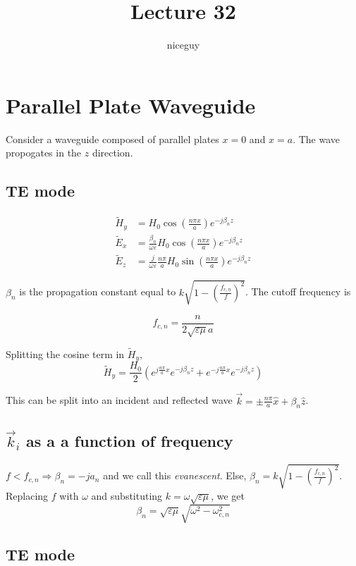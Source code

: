 \documentclass[12pt]{article}
\title{Lecture 32}
\author{niceguy}
\begin{document}
\maketitle

\section{Parallel Plate Waveguide}

Consider a waveguide composed of parallel plates $x = 0$ and $x = a$. The wave propogates in the $z$ direction.

\subsection{TE mode}

\begin{align*}
    \tilde H_y &= H_0\cos\left(\frac{n\pi x}{a}\right)e^{-j\beta_nz} \\
    \tilde E_x &= \frac{\beta_n}{\omega\varepsilon} H_0\cos\left(\frac{n\pi x}{a}\right) e^{-j\beta_nz} \\
    \tilde E_z &= \frac{j}{\omega\varepsilon} \frac{n\pi}{a} H_0\sin\left(\frac{n\pi x}{a}\right)e^{-j\beta_nz}
\end{align*}

$\beta_n$ is the propagation constant equal to $k\sqrt{1 - \left(\frac{f_{c,n}}{f}\right)^2}$. The cutoff frequency is

$$f_{c,n} = \frac{n}{2\sqrt{\varepsilon\mu}a}$$

Splitting the cosine term in $\tilde H_y$,
$$\tilde H_y = \frac{H_0}{2}\left(e^{j\frac{n\pi}{a}x}e^{-j\beta_nz} + e^{-j\frac{n\pi}{a}x}e^{-j\beta_nz}\right)$$

This can be split into an incident and reflected wave $\vec k = \pm \frac{n\pi}{a}\hat x + \beta_n\hat z$.

\subsection{$\vec k_i$ as a a function of frequency}

$f < f_{c,n} \Rightarrow \beta_n = -ja_n$ and we call this \textit{evanescent}. Else, $\beta_n = k\sqrt{1 - \left(\frac{f_{c,n}}{f}\right)^2}$. Replacing $f$ with $\omega$ and substituting $k = \omega\sqrt{\varepsilon\mu}$, we get
$$\beta_n = \sqrt{\varepsilon\mu}\sqrt{\omega^2-\omega_{c,n}^2}$$

\subsection{TE mode}
\end{document}
